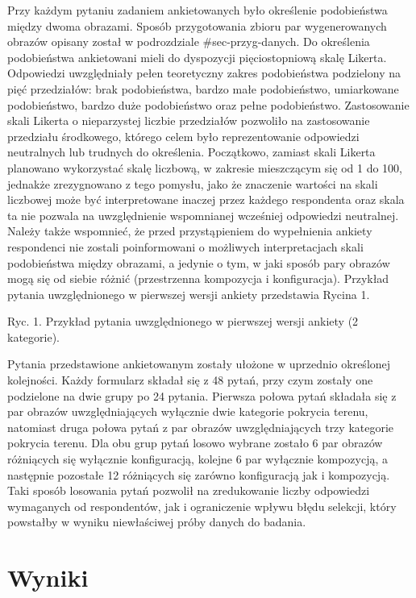 \documentclass{amuthesis}
\begin{document}
Przy każdym pytaniu zadaniem ankietowanych było określenie podobieństwa
między dwoma obrazami. Sposób przygotowania zbioru par wygenerowanych
obrazów opisany został w podrozdziale \#sec-przyg-danych. Do określenia
podobieństwa ankietowani mieli do dyspozycji pięciostopniową skalę
Likerta. Odpowiedzi uwzględniały pełen teoretyczny zakres podobieństwa
podzielony na pięć przedziałów: brak podobieństwa, bardzo małe
podobieństwo, umiarkowane podobieństwo, bardzo duże podobieństwo oraz
pełne podobieństwo. Zastosowanie skali Likerta o nieparzystej liczbie
przedziałów pozwoliło na zastosowanie przedziału środkowego, którego
celem było reprezentowanie odpowiedzi neutralnych lub trudnych do
określenia. Początkowo, zamiast skali Likerta planowano wykorzystać
skalę liczbową, w zakresie mieszczącym się od 1 do 100, jednakże
zrezygnowano z tego pomysłu, jako że znaczenie wartości na skali
liczbowej może być interpretowane inaczej przez każdego respondenta oraz
skala ta nie pozwala na uwzględnienie wspomnianej wcześniej odpowiedzi
neutralnej. Należy także wspomnieć, że przed przystąpieniem do
wypełnienia ankiety respondenci nie zostali poinformowani o możliwych
interpretacjach skali podobieństwa między obrazami, a jedynie o tym, w
jaki sposób pary obrazów mogą się od siebie różnić (przestrzenna
kompozycja i konfiguracja). Przykład pytania uwzględnionego w pierwszej
wersji ankiety przedstawia Rycina 1.

Ryc. 1. Przykład pytania uwzględnionego w pierwszej wersji ankiety (2
kategorie).

Pytania przedstawione ankietowanym zostały ułożone w uprzednio
określonej kolejności. Każdy formularz składał się z 48 pytań, przy czym
zostały one podzielone na dwie grupy po 24 pytania. Pierwsza połowa
pytań składała się z par obrazów uwzględniających wyłącznie dwie
kategorie pokrycia terenu, natomiast druga połowa pytań z par obrazów
uwzględniających trzy kategorie pokrycia terenu. Dla obu grup pytań
losowo wybrane zostało 6 par obrazów różniących się wyłącznie
konfiguracją, kolejne 6 par wyłącznie kompozycją, a następnie pozostałe
12 różniących się zarówno konfiguracją jak i kompozycją. Taki sposób
losowania pytań pozwolił na zredukowanie liczby odpowiedzi wymaganych od
respondentów, jak i ograniczenie wpływu błędu selekcji, który powstałby
w wyniku niewłaściwej próby danych do badania.


\hypertarget{sec-wyniki}{%
\chapter{Wyniki}\label{sec-wyniki}}
\end{document}
